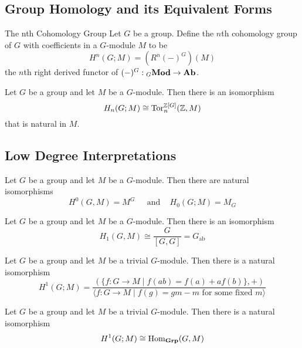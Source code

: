 \documentclass[a4paper]{article}
\begin{document}
\subsection{Group Homology and its Equivalent Forms}
\begin{defn}{The nth Cohomology Group}{} Let $G$ be a group. Define the $n$th cohomology group of $G$ with coefficients in a $G$-module $M$ to be $$H^n(G;M)=(R^n(-)^G)(M)$$ the $n$th right derived functor of $(-)^G:{_G\bold{Mod}}\to\bold{Ab}$. 
\end{defn}

\begin{thm}{}{} Let $G$ be a group and let $M$ be a $G$-module. Then there is an isomorphism $$H_n(G;M)\cong\text{Tor}_n^{\mathbb{Z}[G]}(\mathbb{Z},M)$$ that is natural in $M$. 
\end{thm}

\subsection{Low Degree Interpretations}
\begin{thm}{}{} Let $G$ be a group and let $M$ be a $G$-module. Then there are natural isomorphisms $$H^0(G,M)=M^G\;\;\;\;\text{ and }\;\;\;H_0(G;M)=M_G$$
\end{thm}

\begin{thm}{}{} Let $G$ be a group and let $M$ be a $G$-module. Then there is an isomorphism $$H_1(G,M)\cong\frac{G}{[G,G]}=G_\text{ab}$$
\end{thm}

\begin{thm}{}{} Let $G$ be a group and let $M$ be a trivial $G$-module. Then there is a natural isomorphism $$H^1(G;M)=\frac{(\{f:G\to M\;|\;f(ab)=f(a)+af(b)\},+)}{\langle f:G\to M\;|\;f(g)=gm-m\text{ for some fixed }m\rangle}$$
\end{thm}

\begin{crl}{}{} Let $G$ be a group and let $M$ be a trivial $G$-module. Then there is a natural isomorphism $$H^1(G;M)\cong\operatorname{Hom}_\bold{Grp}(G,M)$$
\end{crl}
\end{document}
